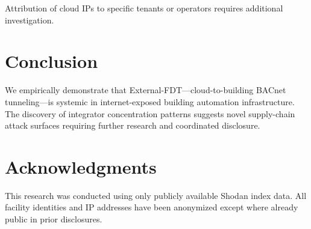 \documentclass[11pt,a4paper]{article}
\begin{document}
Attribution of cloud IPs to specific tenants or operators requires 
additional investigation.

\section{Conclusion}

We empirically demonstrate that External-FDT---cloud-to-building BACnet 
tunneling---is systemic in internet-exposed building automation infrastructure. 
The discovery of integrator concentration patterns suggests novel supply-chain 
attack surfaces requiring further research and coordinated disclosure.

\section*{Acknowledgments}

This research was conducted using only publicly available Shodan index data.
All facility identities and IP addresses have been anonymized except where 
already public in prior disclosures.
\end{document}
